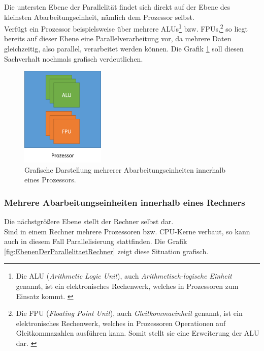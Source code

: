 				Die untersten Ebene der Parallelität findet sich direkt auf der Ebene des kleinsten Abarbeitungseinheit, nämlich dem Prozessor selbst.\\
				Verfügt ein Prozessor beispielsweise über mehrere ALUs\footnote{Die ALU (\textit{Arithmetic Logic Unit}), auch \textit{Arithmetisch-logische Einheit} genannt, ist ein elektronisches Rechenwerk, welches in Prozessoren zum Einsatz kommt. \cite{ALUWikipedia}} bzw. FPUs,\footnote{Die FPU (\textit{Floating Point Unit}), auch \textit{Gleitkommaeinheit} genannt, ist ein elektronisches Rechenwerk, welches in Prozessoren Operationen auf Gleitkommazahlen ausführen kann. Somit stellt sie eine Erweiterung der ALU dar. \cite{FPUWikipedia}} so liegt bereits auf dieser Ebene eine Parallelverarbeitung vor, da mehrere Daten gleichzeitig, also parallel, verarbeitet werden können. Die Grafik \ref{fig:EbenenDerParallelitaetProzessor} soll diesen Sachverhalt nochmals grafisch verdeutlichen. \cite{GrundlagenParallelisierungKegel}
				
				\begin{figure}
					\centering	
					\includegraphics[width=4cm]{Abbildungen/Ebenen_der_Parallelitaet_Prozessor.png}
					\caption{Grafische Darstellung mehrerer Abarbeitungseinheiten innerhalb eines Prozessors.}
					\label{fig:EbenenDerParallelitaetProzessor}
				\end{figure}
			
			\subsubsection{Mehrere Abarbeitungseinheiten innerhalb eines Rechners}
				\label{MehrereAbarbeitungseinheitenRechner}
			
				Die nächstgrößere Ebene stellt der Rechner selbst dar.\\
				Sind in einem Rechner mehrere Prozessoren bzw. CPU-Kerne verbaut, so kann auch in diesem Fall Parallelisierung stattfinden. Die Grafik \ref{fig:EbenenDerParallelitaetRechner} zeigt diese Situation grafisch. \cite{GrundlagenParallelisierungKegel}
				
